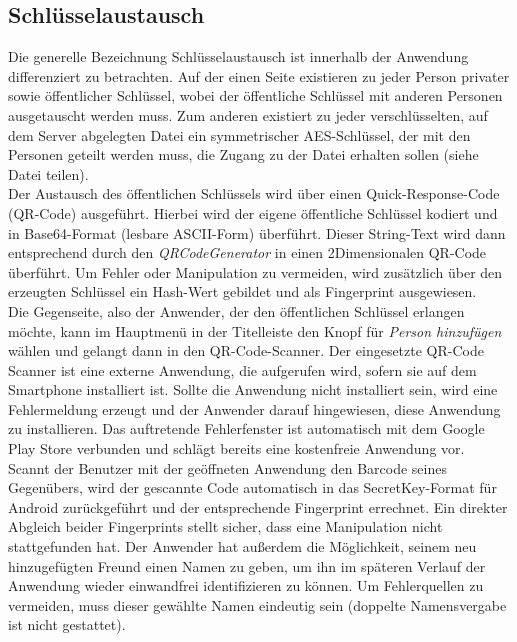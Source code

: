 \documentclass[10pt, a4paper,headsepline,pointednumbers]{scrreprt}
\begin{document}
\subsection{Schlüsselaustausch}
Die generelle Bezeichnung Schlüsselaustausch ist innerhalb der Anwendung differenziert zu betrachten. Auf der einen Seite existieren zu jeder Person privater sowie öffentlicher Schlüssel, wobei der öffentliche Schlüssel mit anderen Personen ausgetauscht werden muss. Zum anderen existiert zu jeder verschlüsselten, auf dem Server abgelegten Datei ein symmetrischer AES-Schlüssel, der mit den Personen geteilt werden muss, die Zugang zu der Datei erhalten sollen (siehe Datei teilen). \\
Der Austausch des öffentlichen Schlüssels wird über einen Quick-Response-Code (QR-Code) ausgeführt. Hierbei wird der eigene öffentliche Schlüssel kodiert und in Base64-Format (lesbare ASCII-Form) überführt. Dieser String-Text wird dann entsprechend durch den \textit{QRCodeGenerator} in einen 2Dimensionalen QR-Code überführt. Um Fehler oder Manipulation zu vermeiden, wird zusätzlich über den erzeugten Schlüssel ein Hash-Wert gebildet und als Fingerprint ausgewiesen. \\
Die Gegenseite, also der Anwender, der den öffentlichen Schlüssel erlangen möchte, kann im Hauptmenü in der Titelleiste den Knopf für \textit{Person hinzufügen} wählen und gelangt dann in den QR-Code-Scanner. Der eingesetzte QR-Code Scanner ist eine externe Anwendung, die aufgerufen wird, sofern sie auf dem Smartphone installiert ist. Sollte die Anwendung nicht installiert sein, wird eine Fehlermeldung erzeugt und der Anwender darauf hingewiesen, diese Anwendung zu installieren. Das auftretende Fehlerfenster ist automatisch mit dem Google Play Store verbunden und schlägt bereits eine kostenfreie Anwendung vor. \\
Scannt der Benutzer mit der geöffneten Anwendung den Barcode seines Gegenübers, wird der gescannte Code automatisch in das SecretKey-Format für Android zurückgeführt und der entsprechende Fingerprint errechnet. Ein direkter Abgleich beider Fingerprints stellt sicher, dass eine Manipulation nicht stattgefunden hat. Der Anwender hat außerdem die Möglichkeit, seinem neu hinzugefügten Freund einen Namen zu geben, um ihn im späteren Verlauf der Anwendung wieder einwandfrei identifizieren zu können. Um Fehlerquellen zu vermeiden, muss dieser gewählte Namen eindeutig sein (doppelte Namensvergabe ist nicht gestattet).
\end{document}
